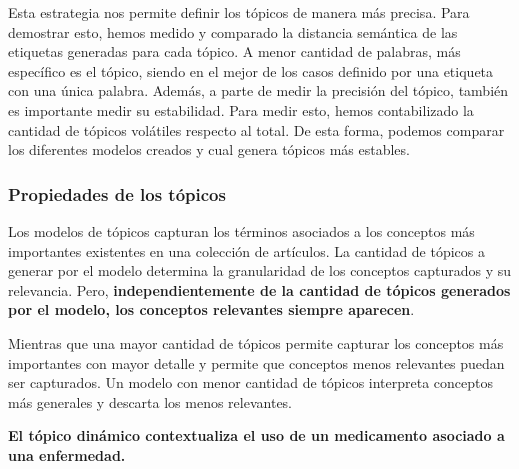 \documentclass[a4paper,10pt]{article}
\begin{document}
Esta estrategia nos permite definir los tópicos de manera más precisa. Para demostrar esto, hemos medido y comparado la distancia semántica de las etiquetas generadas para cada tópico. A menor cantidad de palabras, más específico es el tópico, siendo en el mejor de los casos definido por una etiqueta con una única palabra. Además, a parte de medir la precisión del tópico, también es importante medir su estabilidad. Para medir esto, hemos contabilizado la cantidad de tópicos volátiles respecto al total. De esta forma, podemos comparar los diferentes modelos creados y cual genera tópicos más estables.


\subsubsection{Propiedades de los tópicos}

Los modelos de tópicos capturan los términos asociados a los conceptos más importantes existentes en una colección de artículos. La cantidad de tópicos a generar por el modelo determina la granularidad de los conceptos capturados y su relevancia. Pero, \textbf{independientemente de la cantidad de tópicos generados por el modelo, los conceptos relevantes siempre aparecen}. 

Mientras que una mayor cantidad de tópicos permite capturar los conceptos más importantes con mayor detalle y permite que conceptos menos relevantes puedan ser capturados. Un modelo con menor cantidad de tópicos interpreta conceptos más generales y descarta los menos relevantes.


\textbf{El tópico dinámico contextualiza el uso de un medicamento asociado a una enfermedad.
}




\end{document}
